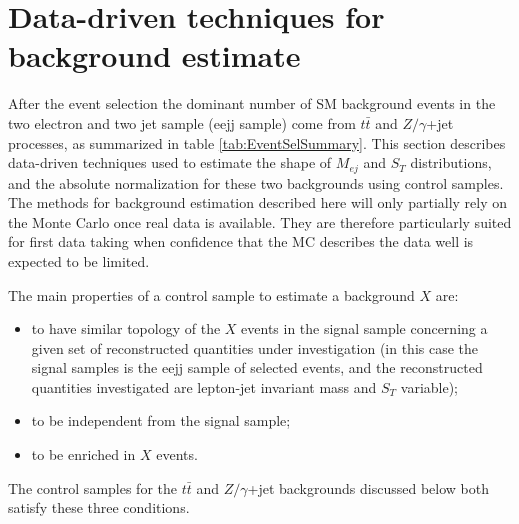 % 

\section{Data-driven techniques for background estimate} \label{sec:bkgStudy}
After the event selection the dominant number of SM background events in the two electron and two jet sample (eejj sample) 
come from $t\bar{t}$ and $Z/\gamma$+jet processes, as summarized in table \ref{tab:EventSelSummary}. 
This section describes data-driven techniques used to estimate the shape of $M_{ej}$ and $S_{T}$ distributions, and the absolute 
normalization for these two backgrounds using control samples. 
The methods for background estimation described here will only partially rely on the Monte Carlo once real data is available. 
They are therefore particularly suited for first data taking when confidence that the MC describes
the data well is expected to be limited.

The main properties of a control sample to estimate a background $X$ are:
\begin{itemize}
%
\item to have similar topology of the $X$ events in the signal sample concerning a given set of 
reconstructed quantities under investigation (in this case the signal samples is the eejj sample of selected events, 
and the reconstructed quantities investigated are lepton-jet invariant mass and $S_{T}$ variable);  
%
\item to be independent from the signal sample;
%
\item to be enriched in $X$ events.
%
\end{itemize}
%
The control samples for the $t\bar{t}$ and $Z/\gamma$+jet backgrounds discussed below both satisfy these three conditions.



